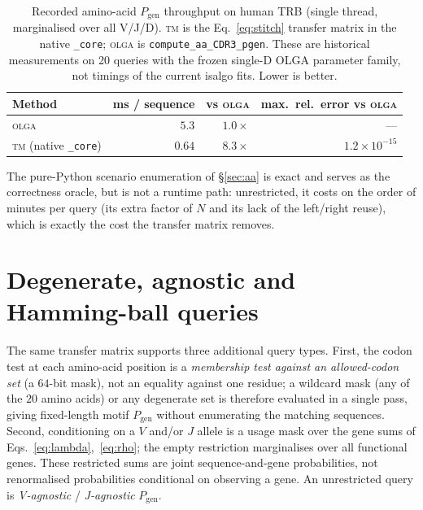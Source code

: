 \documentclass[11pt]{article}
\theoremstyle{oldplain}
\theoremstyle{oldrem}
\newcommand{\Pgen}{P_{\mathrm{gen}}}
\begin{document}
\begin{table}[htbp]\centering
\caption{Recorded amino-acid $\Pgen$ throughput on human TRB (single thread, marginalised over all V/J/D).
\textsc{tm} is the Eq.~\eqref{eq:stitch} transfer matrix in the native \texttt{\_core}; \textsc{olga} is
\texttt{compute\_aa\_CDR3\_pgen}. These are historical measurements on
20 queries with the frozen single-D OLGA parameter family, not timings of the
current isalgo fits. Lower is better.}\label{tab:bench}
\footnotesize
\begin{tabular}{lrrr}\toprule
Method & ms / sequence & vs \textsc{olga} & max.\ rel.\ error vs \textsc{olga} \\\midrule
\textsc{olga}               & $5.3$          & $1.0\times$                   & --- \\
\textsc{tm} (native \texttt{\_core}) & $\mathbf{0.64}$ & $\mathbf{8.3\times}$ & $1.2\times10^{-15}$ \\
\bottomrule\end{tabular}
\end{table}

\noindent The pure-Python scenario enumeration of \S\ref{sec:aa} is exact and serves as the correctness
oracle, but is not a runtime path: unrestricted, it costs on the order of minutes per query (its extra
factor of $N$ and its lack of the left/right reuse), which is exactly the cost the transfer matrix
removes.

\section{Degenerate, agnostic and Hamming-ball queries}\label{sec:motif}

The same transfer matrix supports three additional query types. First, the
codon test at each amino-acid position is a \emph{membership test against an allowed-codon set} (a
$64$-bit mask), not an equality against one residue; a wildcard mask (any of the $20$ amino acids)
or any degenerate set is therefore evaluated in a single pass, giving fixed-length motif $\Pgen$ without
enumerating the matching sequences. Second, conditioning on a $V$ and/or $J$ allele is a usage mask
over the gene sums of Eqs.~\eqref{eq:lambda},~\eqref{eq:rho}; the empty restriction marginalises over
all functional genes. These restricted sums are joint sequence-and-gene probabilities,
not renormalised probabilities conditional on observing a gene. An unrestricted
query is \emph{V-agnostic} / \emph{J-agnostic} $\Pgen$.
\end{document}

